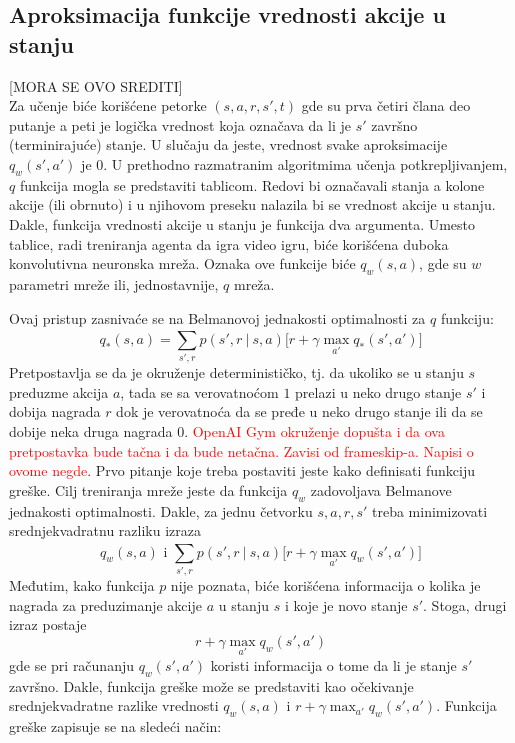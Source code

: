 \subsection{Aproksimacija funkcije vrednosti akcije u stanju}
[MORA SE OVO SREDITI] \\
Za učenje biće korišćene petorke $(s, a, r, s', t)$ gde su prva četiri člana deo putanje a peti je logička vrednost koja označava da li je $s'$ završno (terminirajuće) stanje. U slučaju da jeste, vrednost svake aproksimacije $q_w(s',a')$ je $0$.
U prethodno razmatranim algoritmima učenja potkrepljivanjem, $q$ funkcija mogla se predstaviti tablicom. Redovi bi označavali stanja a kolone akcije (ili obrnuto) i u njihovom preseku nalazila bi se vrednost akcije u stanju. Dakle, funkcija vrednosti akcije u stanju je funkcija dva argumenta. Umesto tablice, radi treniranja agenta da igra video igru, biće korišćena duboka konvolutivna neuronska mreža. Oznaka ove funkcije biće $q_w(s,a)$, gde su $w$ parametri mreže ili, jednostavnije, $q$ mreža.
\par 
Ovaj pristup zasnivaće se na Belmanovoj jednakosti optimalnosti za $q$ funkciju:
\begin{equation}
	q_*(s,a) = \sum_{s', r}^{} p(s', r~|~s,a)\big[r + \gamma \max_{a'}q_*(s',a')\big]
\end{equation}
Pretpostavlja se da je okruženje determinističko, tj. da ukoliko se u stanju $s$ preduzme akcija $a$, tada se sa verovatnoćom $1$ prelazi u neko drugo stanje $s'$  i dobija nagrada $r$ dok je verovatnoća da se pređe u neko drugo stanje ili da se dobije neka druga nagrada $0$. \textcolor{red}{OpenAI Gym okruženje dopušta i da ova pretpostavka bude tačna i da bude netačna. Zavisi od frameskip-a. Napisi o ovome negde}. Prvo pitanje koje treba postaviti jeste kako definisati funkciju greške. Cilj treniranja mreže jeste da funkcija $q_w$ zadovoljava Belmanove jednakosti optimalnosti. Dakle, za jednu četvorku $s, a, r, s'$ treba minimizovati srednjekvadratnu razliku izraza
\begin{equation}
	q_w(s,a) \text{~i~} \sum_{s', r}^{} p(s', r~|~s,a)\big[r + \gamma \max_{a'}q_w(s',a')\big]
\end{equation}
Međutim, kako funkcija $p$ nije poznata, biće korišćena informacija o kolika je nagrada za preduzimanje akcije $a$ u stanju $s$ i koje je novo stanje $s'$. Stoga, drugi izraz postaje
\begin{equation}
	r + \gamma \max_{a'}q_w(s',a')
\end{equation}
gde se pri računanju $q_w(s',a')$ koristi informacija o tome da li je stanje $s'$ završno. Dakle, funkcija greške može se predstaviti kao očekivanje srednjekvadratne razlike vrednosti $q_w(s,a)$ i $r + \gamma \max_{a'}q_w(s',a')$. Funkcija greške zapisuje se na sledeći način:
